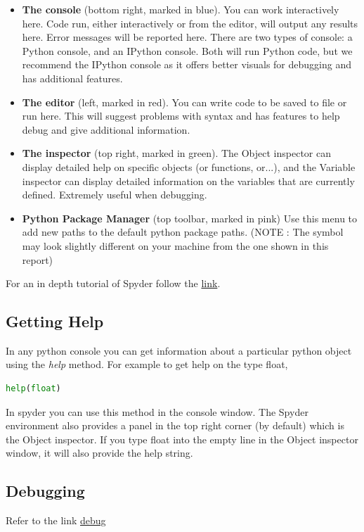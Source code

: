 \documentclass{cmc}
\begin{document}
\begin{itemize}
\item \textbf{The console} (bottom right, marked in blue). You can
  work interactively here. Code run, either interactively or from the
  editor, will output any results here.  Error messages will be
  reported here. There are two types of console: a Python console, and
  an IPython console. Both will run Python code, but we recommend the
  IPython console as it offers better visuals for debugging and has
  additional features.
\item \textbf{The editor} (left, marked in red). You can write code to
  be saved to file or run here. This will suggest problems with syntax
  and has features to help debug and give additional information.
\item \textbf{The inspector} (top right, marked in green). The Object
  inspector can display detailed help on specific objects (or
  functions, or...), and the Variable inspector can display detailed
  information on the variables that are currently defined. Extremely
  useful when debugging.
\item \textbf{Python Package Manager} (top toolbar, marked in pink)
  Use this menu to add new paths to the default python package
  paths. (NOTE : The symbol may look slightly different on your
  machine from the one shown in this report)
\end{itemize}

For an in depth tutorial of Spyder follow the
\href{http://www.southampton.ac.uk/~fangohr/blog/spyder-the-python-ide.html#first-steps-with-spyder}{link}.

\subsection{Getting Help}
\label{sec:getting-help}
In any python console you can get information about a particular
python object using the \textit{help} method. For example to get help
on the type float,
\begin{lstlisting}[language=python]
help(float)
\end{lstlisting}
In spyder you can use this method in the console window.  The Spyder
environment also provides a panel in the top right corner (by default)
which is the Object inspector. If you type float into the empty line
in the Object inspector window, it will also provide the help string.

\subsection{Debugging}
\label{sec:debugging}
Refer to the link
\href{http://www.southampton.ac.uk/~fangohr/blog/spyder-the-python-ide.html#line-by-line-step-execution-of-code}{debug}
\end{document}
